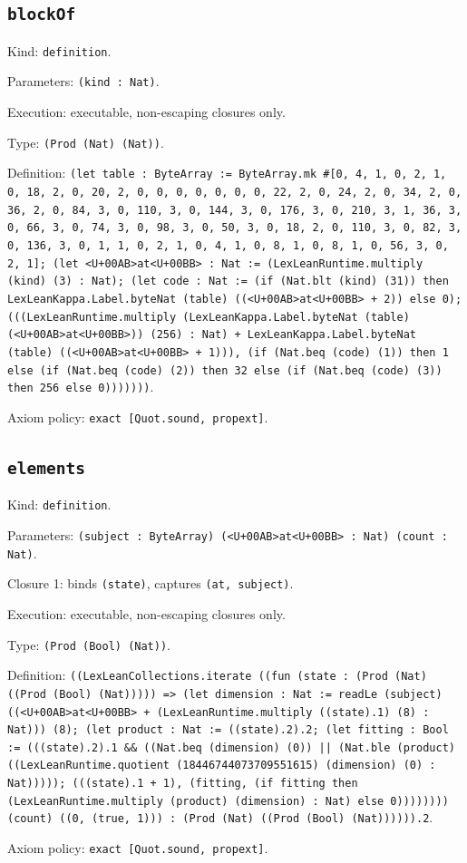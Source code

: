 \documentclass[11pt]{article}
\begin{document}
\subsection*{\texttt{blockOf}}
\noindent Kind: \texttt{definition}.\par
\noindent Parameters: \texttt{(kind : Nat)}.\par
\noindent Execution: executable, non-escaping closures only.\par
\noindent Type: \texttt{(Prod (Nat) (Nat))}.\par
\noindent Definition: \texttt{(let table : ByteArray := ByteArray.mk \#[0, 4, 1, 0, 2, 1, 0, 18, 2, 0, 20, 2, 0, 0, 0, 0, 0, 0, 0, 22, 2, 0, 24, 2, 0, 34, 2, 0, 36, 2, 0, 84, 3, 0, 110, 3, 0, 144, 3, 0, 176, 3, 0, 210, 3, 1, 36, 3, 0, 66, 3, 0, 74, 3, 0, 98, 3, 0, 50, 3, 0, 18, 2, 0, 110, 3, 0, 82, 3, 0, 136, 3, 0, 1, 1, 0, 2, 1, 0, 4, 1, 0, 8, 1, 0, 8, 1, 0, 56, 3, 0, 2, 1]; (let <U+00AB>at<U+00BB> : Nat := (LexLeanRuntime.multiply (kind) (3) : Nat); (let code : Nat := (if (Nat.blt (kind) (31)) then LexLeanKappa.Label.byteNat (table) ((<U+00AB>at<U+00BB> + 2)) else 0); (((LexLeanRuntime.multiply (LexLeanKappa.Label.byteNat (table) (<U+00AB>at<U+00BB>)) (256) : Nat) + LexLeanKappa.Label.byteNat (table) ((<U+00AB>at<U+00BB> + 1))), (if (Nat.beq (code) (1)) then 1 else (if (Nat.beq (code) (2)) then 32 else (if (Nat.beq (code) (3)) then 256 else 0)))))))}.\par
\noindent Axiom policy: \texttt{exact [Quot.sound, propext]}.\par
\subsection*{\texttt{elements}}
\noindent Kind: \texttt{definition}.\par
\noindent Parameters: \texttt{(subject : ByteArray) (<U+00AB>at<U+00BB> : Nat) (count : Nat)}.\par
\noindent Closure 1: binds \texttt{(state)}, captures \texttt{(at, subject)}.\par
\noindent Execution: executable, non-escaping closures only.\par
\noindent Type: \texttt{(Prod (Bool) (Nat))}.\par
\noindent Definition: \texttt{((LexLeanCollections.iterate ((fun (state : (Prod (Nat) ((Prod (Bool) (Nat))))) => (let dimension : Nat := readLe (subject) ((<U+00AB>at<U+00BB> + (LexLeanRuntime.multiply ((state).1) (8) : Nat))) (8); (let product : Nat := ((state).2).2; (let fitting : Bool := (((state).2).1 \&\& ((Nat.beq (dimension) (0)) || (Nat.ble (product) ((LexLeanRuntime.quotient (18446744073709551615) (dimension) (0) : Nat))))); (((state).1 + 1), (fitting, (if fitting then (LexLeanRuntime.multiply (product) (dimension) : Nat) else 0)))))))) (count) ((0, (true, 1))) : (Prod (Nat) ((Prod (Bool) (Nat)))))).2}.\par
\noindent Axiom policy: \texttt{exact [Quot.sound, propext]}.\par
\end{document}
